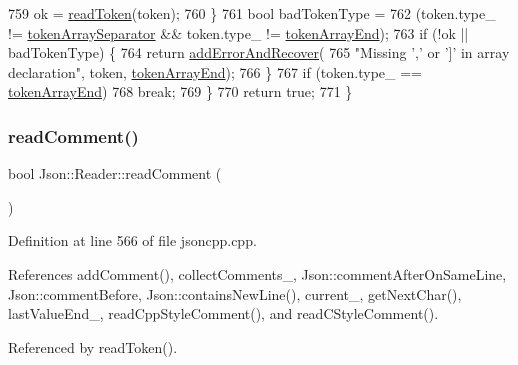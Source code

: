 \begin{DoxyCode}
759       ok = \hyperlink{class_json_1_1_reader_a7cb0631963cc0fd4ff6ed0f570976864}{readToken}(token);
760     \}
761     \textcolor{keywordtype}{bool} badTokenType =
762         (token.type\_ != \hyperlink{class_json_1_1_reader_aa35e6ab574dc399a0a645ad98ed66bc9af2c235e8da86f11ffb1a1243e49ed1fa}{tokenArraySeparator} && token.type\_ != 
      \hyperlink{class_json_1_1_reader_aa35e6ab574dc399a0a645ad98ed66bc9a9adc87fd67f5fc21391a4be89382a316}{tokenArrayEnd});
763     \textcolor{keywordflow}{if} (!ok || badTokenType) \{
764       \textcolor{keywordflow}{return} \hyperlink{class_json_1_1_reader_a478db8ac6d00db1409608a37b66bc38d}{addErrorAndRecover}(
765           \textcolor{stringliteral}{"Missing ',' or ']' in array declaration"}, token, \hyperlink{class_json_1_1_reader_aa35e6ab574dc399a0a645ad98ed66bc9a9adc87fd67f5fc21391a4be89382a316}{tokenArrayEnd});
766     \}
767     \textcolor{keywordflow}{if} (token.type\_ == \hyperlink{class_json_1_1_reader_aa35e6ab574dc399a0a645ad98ed66bc9a9adc87fd67f5fc21391a4be89382a316}{tokenArrayEnd})
768       \textcolor{keywordflow}{break};
769   \}
770   \textcolor{keywordflow}{return} \textcolor{keyword}{true};
771 \}
\end{DoxyCode}
\mbox{\label{class_json_1_1_reader_ad2690e860a1b3332c5401fb0850ba065}} 
\subsubsection{\texorpdfstring{read\+Comment()}{readComment()}}
{\footnotesize\ttfamily bool Json\+::\+Reader\+::read\+Comment (\begin{DoxyParamCaption}{ }\end{DoxyParamCaption})\hspace{0.3cm}{\ttfamily [private]}}



Definition at line 566 of file jsoncpp.\+cpp.



References add\+Comment(), collect\+Comments\+\_\+, Json\+::comment\+After\+On\+Same\+Line, Json\+::comment\+Before, Json\+::contains\+New\+Line(), current\+\_\+, get\+Next\+Char(), last\+Value\+End\+\_\+, read\+Cpp\+Style\+Comment(), and read\+C\+Style\+Comment().



Referenced by read\+Token().


